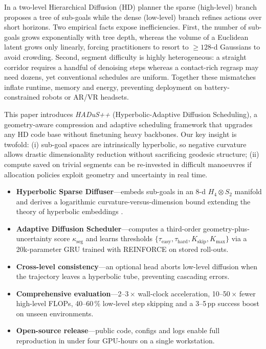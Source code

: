 \documentclass{article}
\begin{document}
In a two-level Hierarchical Diffusion (HD) planner the sparse (high-level) branch proposes a tree of sub-goals while the dense (low-level) branch refines actions over short horizons. Two empirical facts expose inefficiencies. First, the number of sub-goals grows exponentially with tree depth, whereas the volume of a Euclidean latent grows only linearly, forcing practitioners to resort to $\ge 128$-d Gaussians to avoid crowding. Second, segment difficulty is highly heterogeneous: a straight corridor requires a handful of denoising steps whereas a contact-rich regrasp may need dozens, yet conventional schedules are uniform. Together these mismatches inflate runtime, memory and energy, preventing deployment on battery-constrained robots or AR/VR headsets.

This paper introduces \emph{HADuS++} (Hyperbolic-Adaptive Diffusion Scheduling), a geometry-aware compression and adaptive scheduling framework that upgrades any HD code base without finetuning heavy backbones. Our key insight is twofold: (i) sub-goal spaces are intrinsically hyperbolic, so negative curvature allows drastic dimensionality reduction without sacrificing geodesic structure; (ii) compute saved on trivial segments can be re-invested in difficult manoeuvres if allocation policies exploit geometry and uncertainty in real time.

\begin{itemize}
  \item \textbf{Hyperbolic Sparse Diffuser}—embeds sub-goals in an 8-d $H_4\otimes S_2$ manifold and derives a logarithmic curvature-versus-dimension bound extending the theory of hyperbolic embeddings \cite{lin-2023-hyperbolic}.
  \item \textbf{Adaptive Diffusion Scheduler}—computes a third-order geometry-plus-uncertainty score $\kappa_{\text{seg}}$ and learns thresholds $\{\tau_{\text{easy}},\tau_{\text{hard}},K_{\text{skip}},K_{\max}\}$ via a 20k-parameter GRU trained with REINFORCE on stored roll-outs.
  \item \textbf{Cross-level consistency}—an optional head aborts low-level diffusion when the trajectory leaves a hyperbolic tube, preventing cascading errors.
  \item \textbf{Comprehensive evaluation}—2–3\,$\times$ wall-clock acceleration, 10–50\,$\times$ fewer high-level FLOPs, 40–60\,\% low-level step skipping and a 3–5\,pp success boost on unseen environments.
  \item \textbf{Open-source release}—public code, configs and logs enable full reproduction in under four GPU-hours on a single workstation.
\end{itemize}
\end{document}
